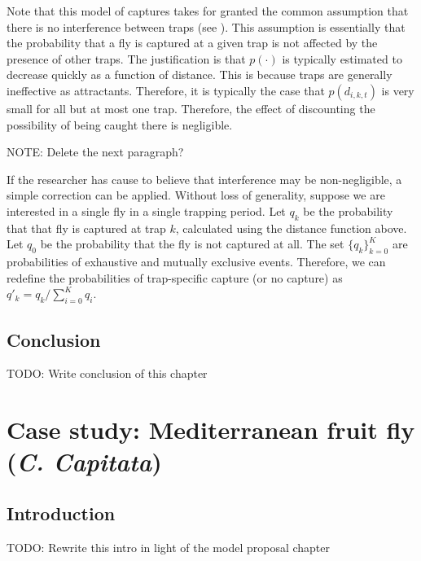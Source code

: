 \documentclass[
  oneside]{book}
\begin{document}
Note that this model of captures takes for granted the common assumption that there is no interference between traps (see \citet{todocite}). This assumption is essentially that the probability that a fly is captured at a given trap is not affected by the presence of other traps. The justification is that \(p(\cdot)\) is typically estimated to decrease quickly as a function of distance. This is because traps are generally ineffective as attractants. Therefore, it is typically the case that \(p(d_{i, k, t})\) is very small for all but at most one trap. Therefore, the effect of discounting the possibility of being caught there is negligible.

NOTE: Delete the next paragraph?

If the researcher has cause to believe that interference may be non-negligible, a simple correction can be applied. Without loss of generality, suppose we are interested in a single fly in a single trapping period. Let \(q_k\) be the probability that that fly is captured at trap \(k\), calculated using the distance function above. Let \(q_0\) be the probability that the fly is not captured at all. The set \(\{q_k\}_{k=0}^K\) are probabilities of exhaustive and mutually exclusive events. Therefore, we can redefine the probabilities of trap-specific capture (or no capture) as \(q'_k = q_k / \sum_{i=0}^K q_i\).

\hypertarget{conclusion-1}{%
\section{Conclusion}\label{conclusion-1}}

TODO: Write conclusion of this chapter

\hypertarget{case-study-mediterranean-fruit-fly-c.-capitata}{%
\chapter{\texorpdfstring{Case study: Mediterranean fruit fly (\emph{C. Capitata})}{Case study: Mediterranean fruit fly (C. Capitata)}}\label{case-study-mediterranean-fruit-fly-c.-capitata}}

\hypertarget{introduction-3}{%
\section{Introduction}\label{introduction-3}}

TODO: Rewrite this intro in light of the model proposal chapter
\end{document}
